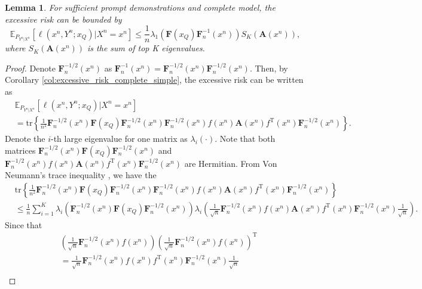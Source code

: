 \documentclass{article} %
\theoremstyle{plain} %
\newtheorem{lemma}[theorem]{Lemma}          %
\begin{document}
\begin{lemma}\label{lem:better_ub_complete}
For sufficient prompt demonstrations and complete model, the excessive risk can be bounded by
\begin{equation*}
    \mathbb{E}_{P_{Y^n|X^n}}\left[ 
\ell \left(x^n,Y^n;x_Q\right) | X^n = x^n\right] \leq \frac1n \lambda_1\left(\mathbf{F}(x_Q)\mathbf{F}_n^{-1}(x^n) \right) S_K({\textbf{A}}(x^n)),
\end{equation*}
where $S_K({\textbf{A}}(x^n))$ is the sum of top K eigenvalues.
\end{lemma}
\begin{proof}
Denote $\mathbf{F}_n^{-1/2}(x^n)$ as $\mathbf{F}_n^{-1}(x^n) = \mathbf{F}_n^{-1/2}(x^n)\mathbf{F}_n^{-1/2}(x^n)$. Then, by Corollary \ref{col:excessive_risk_complete_simple}, the excessive risk can be written as
\begin{align*}
& \mathbb{E}_{P_{Y^n|X^n}}\left[ 
\ell \left(x^n,Y^n;x_Q\right) | X^n = x^n\right]\\
& = \mathrm{tr}\left\{ \frac1{n^2}\mathbf{F}_n^{-1/2}(x^n)\mathbf{F}(x_Q)\mathbf{F}_n^{-1/2}(x^n) \mathbf{F}_n^{-1/2}(x^n) f(x^n){\mathbf{A}}(x^n) f^\mathrm{T}(x^n)\mathbf{F}_n^{-1/2}(x^n) \right\}.
\end{align*}
Denote the $i$-th large eigenvalue for one matrix as $\lambda_i(\cdot)$. Note that both matrices $\mathbf{F}_n^{-1/2}(x^n)\mathbf{F}(x_Q)\mathbf{F}_n^{-1/2}(x^n)$ and $\mathbf{F}_n^{-1/2}(x^n) f(x^n){\mathbf{A}}(x^n) f^\mathrm{T}(x^n)\mathbf{F}_n^{-1/2}(x^n)$ are Hermitian. From Von Neumann's trace inequality \citep{mirsky1975trace}, we have the
\begin{align*}
& \mathrm{tr}\left\{ \frac1{n^2}\mathbf{F}_n^{-1/2}(x^n)\mathbf{F}(x_Q)\mathbf{F}_n^{-1/2}(x^n) \mathbf{F}_n^{-1/2}(x^n) f(x^n){\mathbf{A}}(x^n) f^\mathrm{T}(x^n)\mathbf{F}_n^{-1/2}(x^n) \right\}\\
& \leq \frac1n \sum_{i=1}^K \lambda_i\left(\mathbf{F}_n^{-1/2}(x^n)\mathbf{F}(x_Q)\mathbf{F}_n^{-1/2}(x^n)\right) \lambda_i\left(\frac1{\sqrt{n}}\mathbf{F}_n^{-1/2}(x^n) f(x^n){\mathbf{A}}(x^n) f^\mathrm{T}(x^n)\mathbf{F}_n^{-1/2}(x^n)\frac1{\sqrt{n}}\right).
\end{align*}
Since that
\begin{align*}
& \left(\frac1{\sqrt{n}}\mathbf{F}_n^{-1/2}(x^n) f(x^n)\right)\left(\frac1{\sqrt{n}}\mathbf{F}_n^{-1/2}(x^n) f(x^n)\right)^\mathrm{T}\\
& = \frac1{\sqrt{n}}\mathbf{F}_n^{-1/2}(x^n) f(x^n)f^\mathrm{T}(x^n)\mathbf{F}_n^{-1/2}(x^n)\frac1{\sqrt{n}}\\

\end{align*}
\end{proof}
\end{document}
